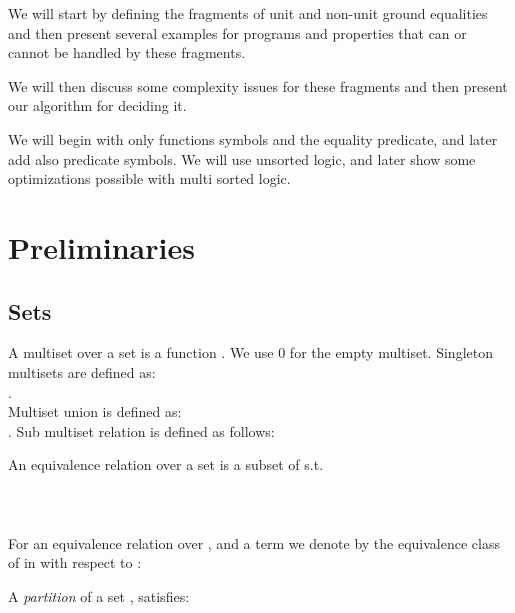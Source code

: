 We will start by defining the fragments of unit and non-unit ground equalities
and then present several examples for programs and properties that can or cannot be handled by these fragments.

We will then discuss some complexity issues for these fragments and then present our algorithm for deciding it.

We will begin with only functions symbols and the equality predicate, and later add also predicate symbols.
We will use unsorted logic, and later show some optimizations possible with multi sorted logic.

\section{Preliminaries}

\subsection{Sets}
A multiset  over a set  is a function .
We use 0 for the empty multiset.
Singleton multisets are defined as:\\
 .\\
Multiset union is defined as:\\
 .
Sub multiset relation is defined as follows:\\

An equivalence relation \m{\approx} over a set  is a subset of  s.t.\\
\\
\\
\\
For an equivalence relation \m{\approx} over , and a term  we denote by 
 the equivalence class of  in  with respect to \m{\approx}:\\

A \emph{partition} of a set , satisfies:\\
\\

